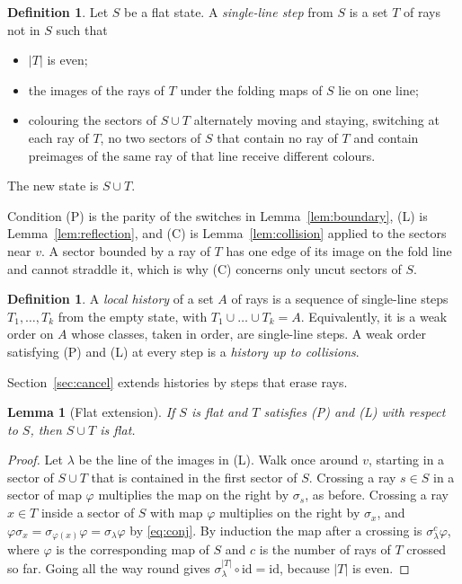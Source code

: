 \documentclass[11pt]{article}
\newtheorem{lemma}[theorem]{Lemma}
\theoremstyle{definition}
\newtheorem{definition}[theorem]{Definition}
\theoremstyle{remark}
\begin{document}
\begin{definition}\label{def:step}
Let $S$ be a flat state. A \emph{single-line step} from $S$ is a set $T$ of rays not in $S$ such that
\begin{itemize}
\item[(P)] $|T|$ is even;
\item[(L)] the images of the rays of $T$ under the folding maps of $S$ lie on one line;
\item[(C)] colouring the sectors of $S\cup T$ alternately moving and staying, switching at each ray of $T$, no two sectors of $S$ that contain no ray of $T$ and contain preimages of the same ray of that line receive different colours.
\end{itemize}
The new state is $S\cup T$.
\end{definition}

Condition (P) is the parity of the switches in Lemma~\ref{lem:boundary}, (L) is Lemma~\ref{lem:reflection}, and (C) is Lemma~\ref{lem:collision} applied to the sectors near $v$. A sector bounded by a ray of $T$ has one edge of its image on the fold line and cannot straddle it, which is why (C) concerns only uncut sectors of $S$.

\begin{definition}\label{def:history}
A \emph{local history} of a set $A$ of rays is a sequence of single-line steps $T_1,\dots,T_k$ from the empty state, with $T_1\cup\dots\cup T_k=A$. Equivalently, it is a weak order on $A$ whose classes, taken in order, are single-line steps. A weak order satisfying (P) and (L) at every step is a \emph{history up to collisions}.
\end{definition}

Section~\ref{sec:cancel} extends histories by steps that erase rays.

\begin{lemma}[Flat extension]\label{lem:flatext}
If $S$ is flat and $T$ satisfies (P) and (L) with respect to $S$, then $S\cup T$ is flat.
\end{lemma}

\begin{proof}
Let $\lambda$ be the line of the images in (L). Walk once around $v$, starting in a sector of $S\cup T$ that is contained in the first sector of $S$. Crossing a ray $s\in S$ in a sector of map $\varphi$ multiplies the map on the right by $\sigma_s$, as before. Crossing a ray $x\in T$ inside a sector of $S$ with map $\varphi$ multiplies on the right by $\sigma_x$, and $\varphi\sigma_x=\sigma_{\varphi(x)}\varphi=\sigma_\lambda\varphi$ by \eqref{eq:conj}. By induction the map after a crossing is $\sigma_\lambda^{c}\varphi$, where $\varphi$ is the corresponding map of $S$ and $c$ is the number of rays of $T$ crossed so far. Going all the way round gives $\sigma_\lambda^{|T|}\circ\mathrm{id}=\mathrm{id}$, because $|T|$ is even.
\end{proof}
\end{document}
